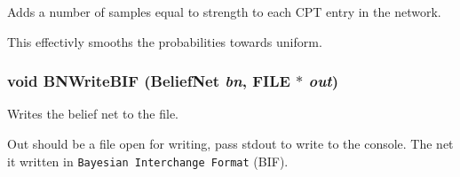 Adds a number of samples equal to strength to each CPT entry in the network. 

This effectivly smooths the probabilities towards uniform. 
\subsubsection{\setlength{\rightskip}{0pt plus 5cm}void BNWrite\-BIF ({\bf Belief\-Net} {\em bn}, FILE $\ast$ {\em out})}\label{BeliefNet_8h_a76}


Writes the belief net to the file. 

Out should be a file open for writing, pass stdout to write to the console. The net it written in {\tt Bayesian Interchange Format} (BIF). 